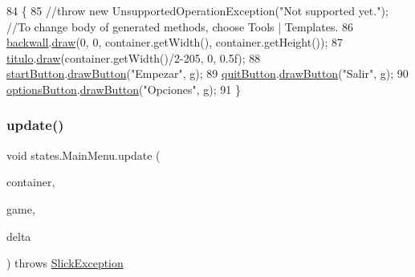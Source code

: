 \begin{DoxyCode}
84                                                                                                        \{
85         \textcolor{comment}{//throw new UnsupportedOperationException("Not supported yet."); //To change body of generated
       methods, choose Tools | Templates.}
86          \mbox{\hyperlink{classstates_1_1_main_menu_a0203042667da8aea22930eb0810d5d9d}{backwall}}.\mbox{\hyperlink{classorg_1_1newdawn_1_1slick_1_1_image_a9bddcca05c7140ab45df8ac5b250b6cd}{draw}}(0, 0, container.getWidth(), container.getHeight());
87         \mbox{\hyperlink{classstates_1_1_main_menu_a185de536bd7c3e47f5c7ade14b27dc84}{titulo}}.\mbox{\hyperlink{classorg_1_1newdawn_1_1slick_1_1_image_a9bddcca05c7140ab45df8ac5b250b6cd}{draw}}(container.getWidth()/2-205, 0, 0.5f);
88         \mbox{\hyperlink{classstates_1_1_main_menu_a0b5fdbfec57ada5a6161f4b2dbc1bfe8}{startButton}}.\mbox{\hyperlink{classgui_1_1_button_a0963af10c0ebfda675428cf6692e3df5}{drawButton}}(\textcolor{stringliteral}{"Empezar"}, g);
89         \mbox{\hyperlink{classstates_1_1_main_menu_ab0fc474be86201071427780c6c500dbb}{quitButton}}.\mbox{\hyperlink{classgui_1_1_button_a0963af10c0ebfda675428cf6692e3df5}{drawButton}}(\textcolor{stringliteral}{"Salir"}, g);
90         \mbox{\hyperlink{classstates_1_1_main_menu_a7e45c28d037c0d5daeb94b99ff83e81e}{optionsButton}}.\mbox{\hyperlink{classgui_1_1_button_a0963af10c0ebfda675428cf6692e3df5}{drawButton}}(\textcolor{stringliteral}{"Opciones"}, g);
91     \}
\end{DoxyCode}
\mbox{\label{classstates_1_1_main_menu_a83292d85c5e93f8209e65afdfed4d5da}} 
\subsubsection{\texorpdfstring{update()}{update()}}
{\footnotesize\ttfamily void states.\+Main\+Menu.\+update (\begin{DoxyParamCaption}\item[{\mbox{\hyperlink{classorg_1_1newdawn_1_1slick_1_1_game_container}{Game\+Container}}}]{container,  }\item[{\mbox{\hyperlink{classorg_1_1newdawn_1_1slick_1_1state_1_1_state_based_game}{State\+Based\+Game}}}]{game,  }\item[{int}]{delta }\end{DoxyParamCaption}) throws \mbox{\hyperlink{classorg_1_1newdawn_1_1slick_1_1_slick_exception}{Slick\+Exception}}\hspace{0.3cm}{\ttfamily [inline]}}

